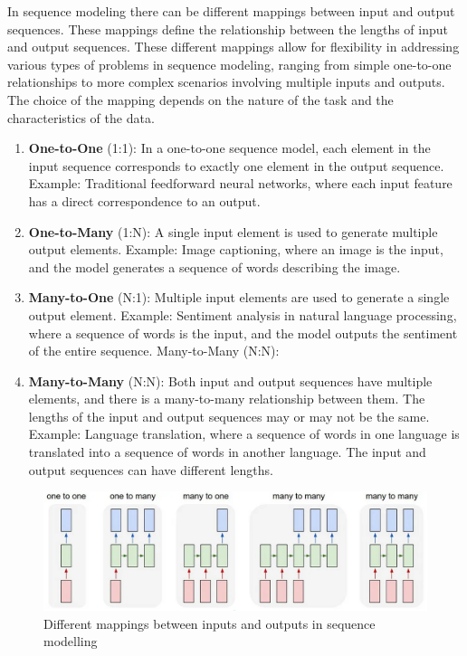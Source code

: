 \documentclass{report}
\begin{document}
In sequence modeling there can be different mappings between input and output sequences. These mappings define the relationship between the lengths of input and output sequences. These different mappings allow for flexibility in addressing various types of problems in sequence modeling, ranging from simple one-to-one relationships to more complex scenarios involving multiple inputs and outputs. The choice of the mapping depends on the nature of the task and the characteristics of the data.

\begin{enumerate}
	\item \textbf{One-to-One} (1:1): In a one-to-one sequence model, each element in the input sequence corresponds to exactly one element in the output sequence.
Example: Traditional feedforward neural networks, where each input feature has a direct correspondence to an output.
\item \textbf{One-to-Many} (1:N): A single input element is used to generate multiple output elements.
Example: Image captioning, where an image is the input, and the model generates a sequence of words describing the image.

\item \textbf{Many-to-One} (N:1): Multiple input elements are used to generate a single output element.
Example: Sentiment analysis in natural language processing, where a sequence of words is the input, and the model outputs the sentiment of the entire sequence.
Many-to-Many (N:N):

\item \textbf{Many-to-Many} (N:N): Both input and output sequences have multiple elements, and there is a many-to-many relationship between them. The lengths of the input and output sequences may or may not be the same.
Example: Language translation, where a sequence of words in one language is translated into a sequence of words in another language. The input and output sequences can have different lengths.
\end{enumerate}

\begin{figure}[ht]
\includegraphics[width=350pt]{32}
\centering
\caption{Different mappings between inputs and outputs in sequence modelling}
\end{figure}
\end{document}
